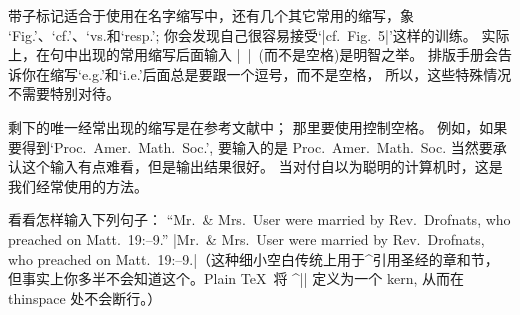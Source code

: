\1带子标记适合于使用在名字缩写中，还有几个其它常用的缩写，象%
`Fig.'、`cf.'、`vs.和`resp.';
你会发现自己很容易接受`|cf.~Fig.~5|'这样的训练。%
实际上，在句中出现的常用缩写后面输入 |~|~(而不是空格)是明智之举。%
排版手册会告诉你在缩写`e.g.'和`i.e.'后面总是要跟一个逗号，而不是空格，
所以，这些特殊情况不需要特别对待。

剩下的唯一经常出现的缩写是在参考文献中；
那里要使用控制空格。%
例如，如果要得到`Proc.\ Amer.\ Math.\ Soc.', 要输入的是
\begintt
Proc.\ Amer.\ Math.\ Soc.
\endtt
当然要承认这个输入有点难看，但是输出结果很好。%
当对付自以为聪明的计算机时，这是我们经常使用的方法。

\exercise 看看怎样输入下列句子：
``Mr.~\& Mrs.~{User}
were married by Rev.~{Drofnats}, who preached on
Matt.~19\thinspace:--9.''
\answer |Mr.~\& Mrs.~User were married by Rev.~Drofnats, who preached on
Matt.~19\thinspace :--9.|（这种细小空白传统上用于^{引用圣经}的章和节，
但事实上你多半不会知道这个。Plain \TeX\ 将 ^|\thinspace| 定义为一个 kern,
从而在 thinspace 处不会断行。）

